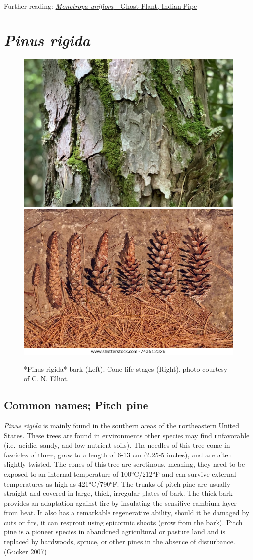 \documentclass[
]{article}
\begin{document}
Further reading: \href{https://www.fs.fed.us/wildflowers/beauty/mycotrophic/monotropa_uniflora.shtml}{\emph{Monotropa uniflora} - Ghost Plant, Indian Pipe}

\hypertarget{pinus-rigida}{%
\section{\texorpdfstring{\emph{Pinus rigida}}{Pinus rigida}}\label{pinus-rigida}}

\begin{figure}

{\centering \includegraphics[width=0.5\linewidth]{p rigida bark} \includegraphics[width=0.5\linewidth]{pitch pine cones} 

}

\caption{*Pinus rigida* bark (Left). Cone life stages (Right), photo courtesy of C. N. Elliot.}\label{fig:rigida}
\end{figure}

\hypertarget{common-names-pitch-pine}{%
\subsection{Common names; Pitch pine}\label{common-names-pitch-pine}}

\emph{Pinus rigida} is mainly found in the southern areas of the northeastern United States. These trees are found in environments other species may find unfavorable (i.e.~acidic, sandy, and low nutrient soils). The needles of this tree come in fascicles of three, grow to a length of 6-13 cm (2.25-5 inches), and are often slightly twisted. The cones of this tree are serotinous, meaning, they need to be exposed to an internal temperature of 100°C/212°F and can survive external temperatures as high as 421°C/790°F. The trunks of pitch pine are usually straight and covered in large, thick, irregular plates of bark. The thick bark provides an adaptation against fire by insulating the sensitive cambium layer from heat. It also has a remarkable regenerative ability, should it be damaged by cuts or fire, it can resprout using epicormic shoots (grow from the bark). Pitch pine is a pioneer species in abandoned agricultural or pasture land and is replaced by hardwoods, spruce, or other pines in the absence of disturbance. (Gucker 2007)
\end{document}
